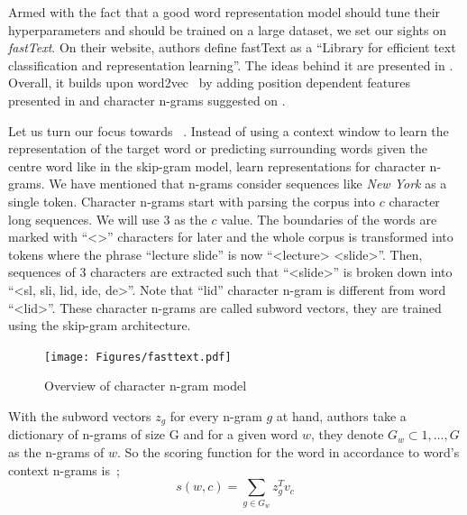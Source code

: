 Armed with the fact that a good word representation model should tune their hyperparameters and should be trained on a large dataset, we set our sights on \emph{fastText}.
On their website, authors define fastText as a \enquote{Library for efficient text classification and representation learning}.
The ideas behind it are presented in \textcite{mikolov2018advances}.
Overall, it builds upon word2vec~\cite{mikolovDistributed2013} by adding position dependent features presented in \textcite{mnih_learning_2013} and character n-grams suggested on \textcite{bojanowskiEnriching2016a}.

Let us turn our focus towards ~\cite{bojanowskiEnriching2016a}.
Instead of using a context window to learn the representation of the target word or predicting surrounding words given the centre word like in the skip-gram model, \citeauthor{bojanowskiEnriching2016a} learn representations for character n-grams.
We have mentioned that n-grams consider sequences like \emph{New York} as a single token.
Character n-grams start with parsing the corpus into $c$ character long sequences.
We will use 3 as the $c$ value.
The boundaries of the words are marked with \enquote{<>} characters for later and the whole corpus is transformed into tokens where the phrase \enquote{lecture slide} is now \enquote{<lecture> <slide>}.
Then, sequences of 3 characters are extracted such that \enquote{<slide>} is broken down into \enquote{<sl, sli, lid, ide, de>}.
Note that \enquote{lid} character n-gram is different from word \enquote{<lid>}.
These character n-grams are called subword vectors, they are trained using the skip-gram architecture.

\begin{figure}[htbp]
    \centering
    \texttt{[image: Figures/fasttext.pdf]}
    \caption{Overview of character n-gram model}%
    \label{fig:fasttext}
\end{figure}

With the subword vectors $z_g$ for every n-gram $g$ at hand, authors take a dictionary of n-grams of size G and for a given word $w$, they denote $G_{w} \subset {1, \dots, G}$ as the n-grams of $w$.
So the scoring function for the word in accordance to word's context n-grams is~\cite{bojanowskiEnriching2016a};
\begin{displaymath}
    s(w,c) = \sum_{g \in G_{w}}z_{g}^T v_c
\end{displaymath}


